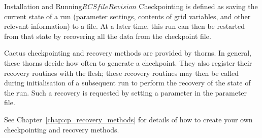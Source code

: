 \begin{cactuspart}{Installation and Running}{$RCSfile$}{$Revision$}
Checkpointing is defined as saving the current state of a run (parameter
settings, contents of grid variables, and other relevant information) to a file.
At a later time, this run can then be restarted from that state by recovering
all the data from the checkpoint file.

Cactus checkpointing and recovery methods are provided by thorns.
In general, these thorns decide how often to generate a checkpoint.
They also register their recovery routines with the flesh; these recovery
routines may then be called during initialisation of a subsequent run to
perform the recovery of the state of the run.
Such a recovery is requested by setting a parameter in the parameter file.

See Chapter~\ref{chap:cp_recovery_methods} for details of how to create
your own checkpointing and recovery methods.


\end{cactuspart}
